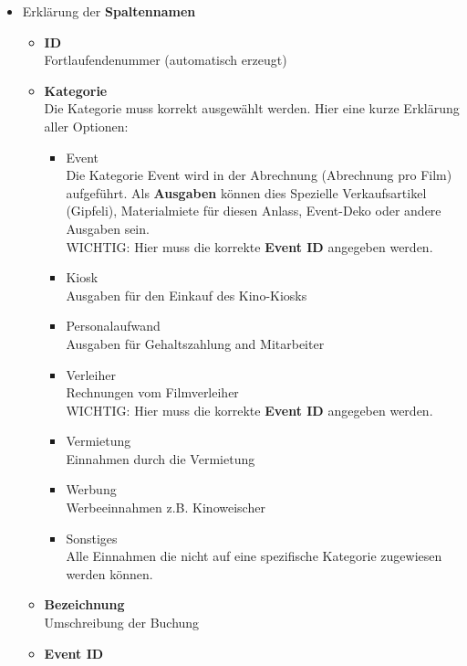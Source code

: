 \documentclass[
]{article}
\providecommand{\tightlist}{%
  \setlength{\itemsep}{0pt}\setlength{\parskip}{0pt}}
\begin{document}
\begin{itemize}
\tightlist
\item
  Erklärung der \textbf{Spaltennamen}

  \begin{itemize}
  \tightlist
  \item
    \textbf{ID}\\
    Fortlaufendenummer (automatisch erzeugt)
  \item
    \textbf{Kategorie}\\
    Die Kategorie muss korrekt ausgewählt werden. Hier eine kurze
    Erklärung aller Optionen:

    \begin{itemize}
    \tightlist
    \item
      Event\\
      Die Kategorie Event wird in der Abrechnung (Abrechnung pro Film)
      aufgeführt. Als \textbf{Ausgaben} können dies Spezielle
      Verkaufsartikel (Gipfeli), Materialmiete für diesen Anlass,
      Event-Deko oder andere Ausgaben sein.\\
      WICHTIG: Hier muss die korrekte \textbf{Event ID} angegeben
      werden.
    \item
      Kiosk\\
      Ausgaben für den Einkauf des Kino-Kiosks
    \item
      Personalaufwand\\
      Ausgaben für Gehaltszahlung and Mitarbeiter
    \item
      Verleiher\\
      Rechnungen vom Filmverleiher\\
      WICHTIG: Hier muss die korrekte \textbf{Event ID} angegeben
      werden.
    \item
      Vermietung\\
      Einnahmen durch die Vermietung
    \item
      Werbung\\
      Werbeeinnahmen z.B. Kinoweischer
    \item
      Sonstiges\\
      Alle Einnahmen die nicht auf eine spezifische Kategorie zugewiesen
      werden können.\\
    \end{itemize}
  \item
    \textbf{Bezeichnung}\\
    Umschreibung der Buchung
  \item
    \textbf{Event ID}\\

\end{itemize}
\end{itemize}
\end{document}

